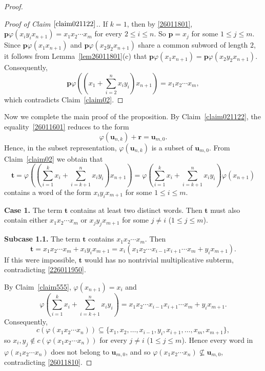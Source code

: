 \documentclass[reqno]{amsart}
\theoremstyle{plain}
\theoremstyle{definition}
\newcommand{\bp}{\mathbf{p}}
\newcommand{\br}{\mathbf{r}}
\newcommand{\bt}{\mathbf{t}}
\newcommand{\bu}{\mathbf{u}}
\begin{document}
\begin{proof}
\begin{proof}[Proof of Claim $\ref{claim021122}$.]
If $k=1$, then by \eqref{26011801}, $\bp\varphi(x_iy_ix_{n+1})=x_1x_2\cdots x_m$ for every $2\leq i\leq n$.
So $\bp=x_j$ for some $1\leq j \leq m$.
Since $\bp\varphi(x_1x_{n+1})$ and $\bp\varphi(x_2y_2x_{n+1})$ share a common subword of length $2$,
it follows from Lemma~\ref{lem26011801}(c) that $\bp\varphi(x_1x_{n+1})=\bp\varphi(x_2y_2x_{n+1})$.
Consequently,
\[
\bp\varphi\left(\left(x_1+\sum_{i=2}^nx_iy_i\right)x_{n+1}\right)= x_1x_2\cdots x_m,
\]
which contradicts Claim~\ref{claim02}.
\end{proof}

Now we complete the main proof of the proposition.
By Claim~\ref{claim021122}, the equality~\eqref{26011601} reduces to the form
\begin{equation}\label{26011810}
\varphi(\bu_{n,k})+\br=\bu_{m,0}.
\end{equation}
Hence, in the subset representation, $\varphi(\bu_{n,k})$ is a subset of $\bu_{m,0}$.
From Claim~\ref{claim02} we obtain that
\begin{equation}\label{226011950}
\bt=\varphi\left(\left(\sum_{i=1}^kx_i
               +\sum_{i=k+1}^nx_iy_i\right)x_{n+1}\right)
               =\varphi\left(\sum_{i=1}^kx_i
               +\sum_{i=k+1}^nx_iy_i\right)\varphi(x_{n+1})
\end{equation}
contains a word of the form $x_iy_ix_{m+1}$ for some $1\leq i \leq m$.

\textbf{Case 1.} The term $\bt$ contains at least two distinct words.
Then $\bt$ must also contain either $x_1x_2\cdots x_m$ or $x_jy_jx_{m+1}$ for some $j\neq i$ ($1\leq j\leq m$).

\textbf{Subcase 1.1.} The term $\bt$ contains $x_1x_2\cdots x_m$. Then
\[
\bt=x_1x_2\cdots x_m+x_iy_ix_{m+1}=x_i(x_1x_2\cdots x_{i-1}x_{i+1}\cdots x_m+y_ix_{m+1}).
\]
If this were impossible, $\bt$ would has no nontrivial multiplicative subterm, contradicting \eqref{226011950}.

By Claim~\ref{claim555}, $\varphi(x_{n+1})=x_i$ and
\[
\varphi\left(\sum_{i=1}^kx_i+\sum_{i=k+1}^nx_iy_i\right)=x_1x_2\cdots x_{i-1}x_{i+1}\cdots x_m+y_ix_{m+1}.
\]
Consequently,
\[
c(\varphi(x_1x_2\cdots x_n))\subseteq \{x_1,x_2,\dots, x_{i-1}, y_i, x_{i+1},\dots, x_m, x_{m+1}\},
\]
so $x_i, y_j\notin c(\varphi(x_1x_2\cdots x_n))$ for every $j\neq i$ ($1\leq j \leq m$).
Hence every word in $\varphi(x_1x_2\cdots x_n)$ does not belong to $\bu_{m,0}$,
and so $\varphi(x_1x_2\cdots x_n)\nsubseteq \bu_{m,0}$, contradicting \eqref{26011810}.


\end{proof}
\end{document}
